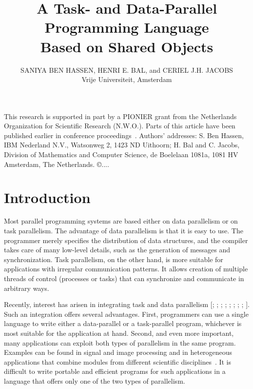 \documentclass{acmtrans2e}
\title{A Task- and Data-Parallel Programming Language\\ Based on Shared Objects}
\author{SANIYA BEN HASSEN, HENRI E. BAL, and CERIEL J.H. JACOBS\\
Vrije Universiteit, Amsterdam}
\begin{document}
\begin{bottomstuff}
This research is supported in part by a
PIONIER grant from the Netherlands Organization for Scientific
Research (N.W.O.).\newline
Parts of this article have been published earlier in conference
proceedings~\cite{hicss96,oopsla96,ics96}.\newline
Authors' addresses:
S. Ben Hassen, IBM Nederland N.V., Watsonweg 2, 1423 ND Uithoorn;
H. Bal and C. Jacobs, Division of Mathematics and Computer Science,
de Boelelaan 1081a, 1081 HV Amsterdam, The Netherlands.
\permission
\copyright ....
\end{bottomstuff}
\maketitle

\section{Introduction}
\label{sec:introduction}

Most parallel programming systems are based either on data parallelism
or on task parallelism.  The advantage of data parallelism is that it
is easy to use. The programmer merely specifies the distribution of
data structures, and the compiler takes care of many low-level details,
such as the generation of messages and synchronization.  Task
parallelism, on the other hand, is more suitable for applications with
irregular communication patterns.  It allows creation of multiple
threads of control (processes or tasks) that can synchronize and
communicate in arbitrary ways.

Recently, interest has arisen in integrating task and data
parallelism
[; ; ;
; ; ;
; ; ].
Such an integration offers several advantages. First, programmers can
use a single language to write either a data-parallel or a task-parallel
program, whichever is most suitable for the application at
hand. Second, and even more important, many applications can exploit
both types of parallelism in the same program.  Examples can be found
in signal and image processing and in heterogeneous applications that
combine modules from different scientific disciplines~\cite{gross94}.
It is difficult to write portable and efficient programs for such
applications in a language that offers only one of the two types of
parallelism.
\end{document}
